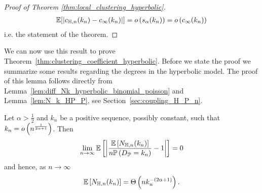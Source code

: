 \begin{proof}[Proof of Theorem \ref{thm:local_clustering_hyperbolic}]
\begin{align*}
    \mathbb{E}[|c_{\mathbb{H},n}(k_n)-c_\infty(k_n)|] = o\left(s_\alpha(k_n)\right) = o\left(c_\infty(k_n)\right)
\end{align*}
i.e. the statement of the theorem.

\end{proof}

We can now use this result to prove Theorem~\ref{thm:clustering_coefficient_hyperbolic}. Before we state the proof we summarize some results regarding the degrees in the hyperbolic model. The proof of this lemma follows directly from Lemma~\ref{lem:diff_Nk_hyperbolic_binomial_poisson} and Lemma~\ref{lem:N_k_HP_P}, see Section~\ref{sec:coupling_H_P_n}.


\begin{lemma}\label{lem:N_k_H_P}
Let $\alpha > \frac{1}{2}$ and $k_n$ be a positive sequence, possibly constant, such that $k_n = o\left(n^{\frac{1}{2\alpha + 1}}\right)$. Then
\[
	\lim_{n\to \infty} \mathbb{E}\left[\left|\frac{\mathbb{E}\left[N_{\mathbb{H},n}(k_n)\right]}{n \mathbb{P}\left(D_{{\mathcal P}} = k_n\right)} - 1\right|\right] = 0
\]
and hence, as $n \to \infty$
\[
	\mathbb{E}\left[N_{\mathbb{H},n}(k_n)\right] = \Theta\left(n k_n^{-(2\alpha + 1)}\right).
\]
\end{lemma}

